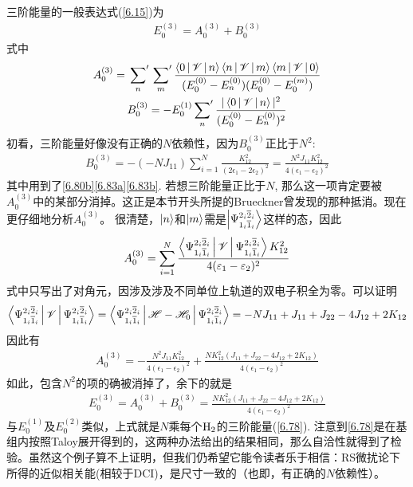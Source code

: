 三阶能量的一般表达式(\eqref{6.15})为
\begin{align}
E_0^{(3)} = A_0^{(3)} + B_{0}^{(3)}
\end{align}
式中
\begin{gather}
A_0^{(3)} = \sideset{}{'}\sum_n \sideset{}{'}\sum_m \frac{\Braket{0|\mathscr{V}|n}\Braket{n|\mathscr{V}|m}\Braket{m|\mathscr{V}|0}}{(E_0^{(0)} - E_n^{(0)}) (E_0^{(0)} - E_0^{(m)}) }\\
B_0^{(3)} = -E_0^{(1)}\sideset{}{'}{\sum}_n\frac{|\Braket{0|\mathscr{V}|n}|^2}{(E_0^{(0)} - E_n^{(0)})^2}
\end{gather}
初看，三阶能量好像没有正确的$N$依赖性，因为$B_0^{(3)}$正比于$N^2$:
\begin{align}
B_0^{(3)} = -(-NJ_{11}) \sum_{i=1}^{N} \frac{K_{12}^2}{(2\epsilon_1 - 2\epsilon_2)^2} = \frac{N^2J_{11}K_{12}^2}{4(\epsilon_1-\epsilon_2)^2}
\end{align}
其中用到了\eqref{6.80b}\eqref{6.83a}\eqref{6.83b}. 若想三阶能量正比于$N$, 那么这一项肯定要被$A_0^{(3)}$中的某部分消掉。这正是本节开头所提的Brueckner曾发现的那种抵消。现在更仔细地分析$A_0^{(3)}$。 很清楚，$\Ket{n}$和$\Ket{m}$需是$\Ket{\Psi_{1_i\overline{1}_i}^{2_i\overline{2}_i}}$这样的态，因此
\begin{align}
A_0^{(3)} = \sum_{i=1}^{N} \frac{\Braket{\Psi_{1_i\overline{1}_i}^{2_i\overline{2}_i}|\mathscr{V}|\Psi_{1_i\overline{1}_i}^{2_i\overline{2}_i}}K_{12}^2}{4(\varepsilon_1 - \varepsilon_2)^2}
\end{align}
式中只写出了对角元，因涉及涉及不同单位上轨道的双电子积全为零。可以证明
\begin{align}\Braket{\Psi_{1_i\overline{1}_i}^{2_i\overline{2}_i}|\mathscr{V}|\Psi_{1_i\overline{1}_i}^{2_i\overline{2}_i}} = \Braket{\Psi_{1_i\overline{1}_i}^{2_i\overline{2}_i}|\mathscr{H}-\mathscr{H}_0|\Psi_{1_i\overline{1}_i}^{2_i\overline{2}_i}}=-NJ_{11} + J_{11} + J_{22} - 4J_{12} + 2K_{12}
\label{6.90}
\end{align}
因此有
\begin{align}
A_0^{(3)} = - \frac{N^2J_{11}K_{12}^2}{4(\epsilon_1 - \epsilon_2)^2} + \frac{NK_{12}^2(J_{11} + J_{22} - 4J_{12} + 2K_{12})}{4(\epsilon_1 - \epsilon_2)^2}
\end{align}
如此，包含$N^2$的项的确被消掉了，余下的就是
\begin{align}
E_0^{(3)} = A_0^{(3)} + B_0^{(3)} = \frac{NK_{12}^2(J_{11} + J_{22} - 4J_{12} + 2K_{12})}{4(\epsilon_1 - \epsilon_2)^2}
\label{eq:6.92}
\end{align}
与$E_0^{(1)}$及$E_0^{(2)}$类似，上式就是$N$乘每个$\mathrm{H}_2$的三阶能量(\eqref{6.78}). 注意到\eqref{6.78}是在基组内按照Taloy展开得到的，这两种办法给出的结果相同，那么自洽性就得到了检验。虽然这个例子算不上证明，但我们仍希望它能令读者乐于相信：RS微扰论下所得的近似相关能(相较于DCI)，是尺寸一致的（也即，有正确的$N$依赖性）。
